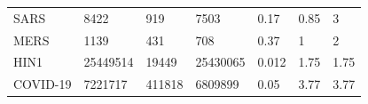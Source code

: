 \documentclass[a4paper, 11pt,twoside=true]{scrartcl}
\begin{document}
\begin{table}[H]
\begin{tabular}{lllllll}
		SARS                   & 8422               & 919             & 7503               & 0.17                 & 0.85             & 3                \\
		MERS                   & 1139               & 431             & 708                & 0.37                 & 1                & 2                \\
		HIN1                   & 25449514           & 19449           & 25430065           & 0.012                & 1.75             & 1.75             \\
		COVID-19               & 7221717            & 411818          & 6809899            & 0.05                 & 3.77             & 3.77             \\ \hline
	\end{tabular}
\end{table}
\end{document}
